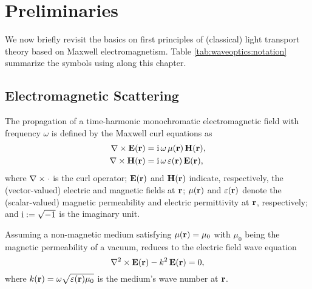 \section{Preliminaries}
\label{sec:waveoptics:prelim}

We now briefly revisit the basics on first principles of (classical) light transport theory based on Maxwell electromagnetism. Table \ref{tab:waveoptics:notation} summarize the symbols using along this chapter.



\subsection{Electromagnetic Scattering}
\label{ssec:prelim_maxwells}

The propagation of a time-harmonic monochromatic electromagnetic field with frequency $\omega$ is defined by the Maxwell curl equations as
\begin{equation}
    \begin{aligned}
        \nabla\times\mathbf{E}(\mathbf{r}) &= \mathrm{i}\,\omega\,\mu(\mathbf{r})\,\mathbf{H}(\mathbf{r}),\\
        \nabla\times\mathbf{H}(\mathbf{r}) &= \mathrm{i}\,\omega\,\varepsilon(\mathbf{r})\,\mathbf{E}(\mathbf{r}),
    \end{aligned}
    \label{eq:maxwell}
\end{equation}
where $\nabla\times\cdot$ is the curl operator; $\mathbf{E}(\mathbf{r})$ and $\mathbf{H}(\mathbf{r})$ indicate, respectively, the (vector-valued) electric and magnetic fields at $\mathbf{r}$; $\mu(\mathbf{r})$ and $\varepsilon(\mathbf{r})$ denote the (scalar-valued) magnetic permeability and electric permittivity at $\mathbf{r}$, respectively; and $\mathrm{i} := \sqrt{-1}$ is the imaginary unit.

Assuming a non-magnetic medium satisfying $\mu(\mathbf{r}) = \mu_0$ with $\mu_0$ being the magnetic permeability of a vacuum,  reduces to the electric field wave equation
\begin{equation}
    \nabla^2\times\mathbf{E}(\mathbf{r}) - k^2\,\mathbf{E}(\mathbf{r}) = 0,
    \label{eq:efieldwave}
\end{equation}
where $k(\mathbf{r}) = \omega\sqrt{\varepsilon(\mathbf{r})\mu_0}$ is the medium's wave number at $\mathbf{r}$. 

